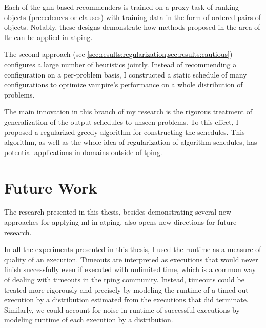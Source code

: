Each of the \acrshort{gnn}-based recommenders is trained on a proxy task of ranking objects (precedences or clauses)
with training data in the form of ordered pairs of objects.
Notably, these designs demonstrate how methods proposed in the area of \acrlong{ltr}
can be applied in \gls{atping}.

The second approach (see \cref{sec:results:regularization,sec:results:cautious}) configures a large number of heuristics jointly.
Instead of recommending a configuration on a per-problem basis,
I constructed a static schedule of many configurations to optimize \gls{vampire}'s performance on a whole distribution of problems.

The main innovation in this branch of my research is the rigorous treatment of generalization of the output schedules to unseen problems.
To this effect, I proposed a regularized greedy algorithm for constructing the schedules.
This algorithm, as well as the whole idea of regularization of algorithm schedules, has potential applications in domains outside of \gls{tping}.


\section{Future Work}


The research presented in this thesis,
besides demonstrating several new approaches for applying \gls{ml} in \gls{atping},
also opens new directions for future research.

In all the experiments presented in this thesis, I used the runtime as a measure of quality of an execution.
Timeouts are interpreted as executions that would never finish successfully even if executed with unlimited time, which is a common way of dealing with timeouts in the \gls{tping} community.
Instead, timeouts could be treated more rigorously and precisely by modeling the runtime of a timed-out execution by a distribution estimated from the executions that did terminate.
Similarly, we could account for noise in runtime of successful executions by modeling runtime of each execution by a distribution.

